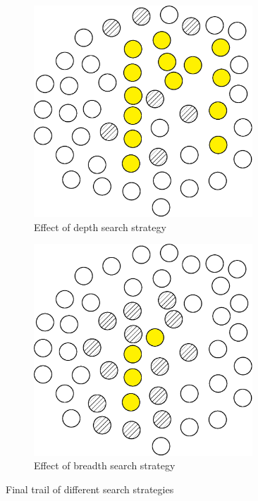 \documentclass[english,a4paper,twoside]{ppfcmthesis}
\begin{document}
\begin{figure}
  \centering

  \begin{subfigure}{0.47\textwidth}
    \centering
    \includegraphics[width=0.9\textwidth]{algorithm/metaheuristic/strategy_dfs.eps}
    \caption{Effect of depth search strategy}
  \end{subfigure}
  \begin{subfigure}{0.47\textwidth}
    \centering
    \includegraphics[width=0.9\textwidth]{algorithm/metaheuristic/strategy_bfs.eps}
    \caption{Effect of breadth search strategy}
  \end{subfigure}

  \caption{Final trail of different search strategies}
  \label{figure:m_strategy}
\end{figure}
\end{document}
